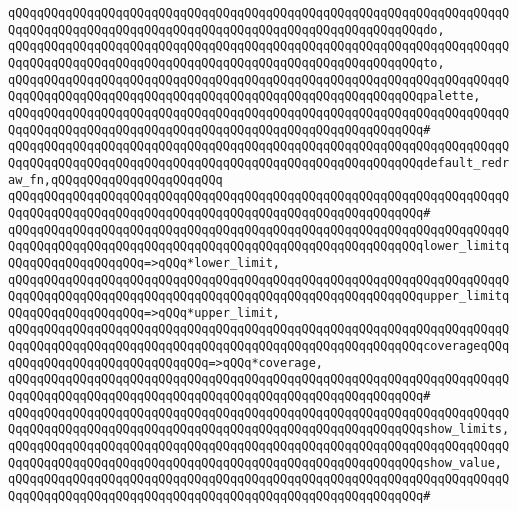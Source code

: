 \verb|qQQqqQQqqQQqqQQqqQQqqQQqqQQqqQQqqQQqqQQqqQQqqQQqqQQqqQQqqQQqqQQqqQQqqQQqqQQqqQQqqQQqqQQqqQQqqQQqqQQqqQQqqQQqqQQqqQQqqQQqqQQqqQQqdo,|\newline
\verb|qQQqqQQqqQQqqQQqqQQqqQQqqQQqqQQqqQQqqQQqqQQqqQQqqQQqqQQqqQQqqQQqqQQqqQQqqQQqqQQqqQQqqQQqqQQqqQQqqQQqqQQqqQQqqQQqqQQqqQQqqQQqqQQqto,|\newline
\verb|qQQqqQQqqQQqqQQqqQQqqQQqqQQqqQQqqQQqqQQqqQQqqQQqqQQqqQQqqQQqqQQqqQQqqQQqqQQqqQQqqQQqqQQqqQQqqQQqqQQqqQQqqQQqqQQqqQQqqQQqqQQqqQQqpalette,|\newline
\verb|qQQqqQQqqQQqqQQqqQQqqQQqqQQqqQQqqQQqqQQqqQQqqQQqqQQqqQQqqQQqqQQqqQQqqQQqqQQqqQQqqQQqqQQqqQQqqQQqqQQqqQQqqQQqqQQqqQQqqQQqqQQqqQQq#|\newline
\verb|qQQqqQQqqQQqqQQqqQQqqQQqqQQqqQQqqQQqqQQqqQQqqQQqqQQqqQQqqQQqqQQqqQQqqQQqqQQqqQQqqQQqqQQqqQQqqQQqqQQqqQQqqQQqqQQqqQQqqQQqqQQqqQQqdefault_redraw_fn,qQQqqQQqqQQqqQQqqQQqqQQq|\newline
\verb|qQQqqQQqqQQqqQQqqQQqqQQqqQQqqQQqqQQqqQQqqQQqqQQqqQQqqQQqqQQqqQQqqQQqqQQqqQQqqQQqqQQqqQQqqQQqqQQqqQQqqQQqqQQqqQQqqQQqqQQqqQQqqQQq#|\newline
\verb|qQQqqQQqqQQqqQQqqQQqqQQqqQQqqQQqqQQqqQQqqQQqqQQqqQQqqQQqqQQqqQQqqQQqqQQqqQQqqQQqqQQqqQQqqQQqqQQqqQQqqQQqqQQqqQQqqQQqqQQqqQQqqQQqlower_limitqQQqqQQqqQQqqQQqqQQq=>qQQq*lower_limit,|\newline
\verb|qQQqqQQqqQQqqQQqqQQqqQQqqQQqqQQqqQQqqQQqqQQqqQQqqQQqqQQqqQQqqQQqqQQqqQQqqQQqqQQqqQQqqQQqqQQqqQQqqQQqqQQqqQQqqQQqqQQqqQQqqQQqqQQqupper_limitqQQqqQQqqQQqqQQqqQQq=>qQQq*upper_limit,|\newline
\verb|qQQqqQQqqQQqqQQqqQQqqQQqqQQqqQQqqQQqqQQqqQQqqQQqqQQqqQQqqQQqqQQqqQQqqQQqqQQqqQQqqQQqqQQqqQQqqQQqqQQqqQQqqQQqqQQqqQQqqQQqqQQqqQQqcoverageqQQqqQQqqQQqqQQqqQQqqQQqqQQqqQQq=>qQQq*coverage,|\newline
\verb|qQQqqQQqqQQqqQQqqQQqqQQqqQQqqQQqqQQqqQQqqQQqqQQqqQQqqQQqqQQqqQQqqQQqqQQqqQQqqQQqqQQqqQQqqQQqqQQqqQQqqQQqqQQqqQQqqQQqqQQqqQQqqQQq#|\newline
\verb|qQQqqQQqqQQqqQQqqQQqqQQqqQQqqQQqqQQqqQQqqQQqqQQqqQQqqQQqqQQqqQQqqQQqqQQqqQQqqQQqqQQqqQQqqQQqqQQqqQQqqQQqqQQqqQQqqQQqqQQqqQQqqQQqshow_limits,|\newline
\verb|qQQqqQQqqQQqqQQqqQQqqQQqqQQqqQQqqQQqqQQqqQQqqQQqqQQqqQQqqQQqqQQqqQQqqQQqqQQqqQQqqQQqqQQqqQQqqQQqqQQqqQQqqQQqqQQqqQQqqQQqqQQqqQQqshow_value,|\newline
\verb|qQQqqQQqqQQqqQQqqQQqqQQqqQQqqQQqqQQqqQQqqQQqqQQqqQQqqQQqqQQqqQQqqQQqqQQqqQQqqQQqqQQqqQQqqQQqqQQqqQQqqQQqqQQqqQQqqQQqqQQqqQQqqQQq#|\newline
